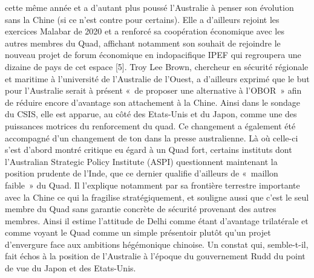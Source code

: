 \documentclass[11pt,a4paper]{article}
\begin{document}
cette même année et a d'autant plus poussé l'Australie à penser son évolution sans la Chine (si ce n'est contre pour certains). Elle a d'ailleurs rejoint les exercices Malabar de 2020 et a renforcé sa coopération économique avec les autres membres du Quad, affichant notamment son souhait de rejoindre le nouveau projet de forum économique en indopacifique IPEF qui regroupera une dizaine de pays de cet espace {[}5{]}. Troy Lee Brown, chercheur en sécurité régionale et maritime à l'université de l'Australie de l'Ouest, a d'ailleurs exprimé que le but pour l'Australie serait à présent «~de proposer une alternative à l'OBOR~» afin de réduire encore d'avantage son attachement à la Chine. Ainsi dans le sondage du CSIS, elle est apparue, au côté des Etats-Unis et du Japon, comme une des puissances motrices du renforcement du quad. Ce changement a également été accompagné d'un changement de ton dans la presse australienne. Là où celle-ci s'est d'abord montré critique eu égard à un Quad fort, certains instituts dont l'Australian Strategic Policy Institute (ASPI) questionnent maintenant la position prudente de l'Inde, que ce dernier qualifie d'ailleurs de «~maillon faible~» du Quad. Il l'explique notamment par sa frontière terrestre importante avec la Chine ce qui la fragilise stratégiquement, et souligne aussi que c'est le seul membre du Quad sans garantie concrète de sécurité provenant des autres membres. Ainsi il estime l'attitude de Delhi comme étant d'avantage trilatérale et comme voyant le Quad comme un simple présentoir plutôt qu'un projet d'envergure face aux ambitions hégémonique chinoise. Un constat qui, semble-t-il, fait échos à la position de l'Australie à l'époque du gouvernement Rudd du point de vue du Japon et des Etats-Unis.
\end{document}

